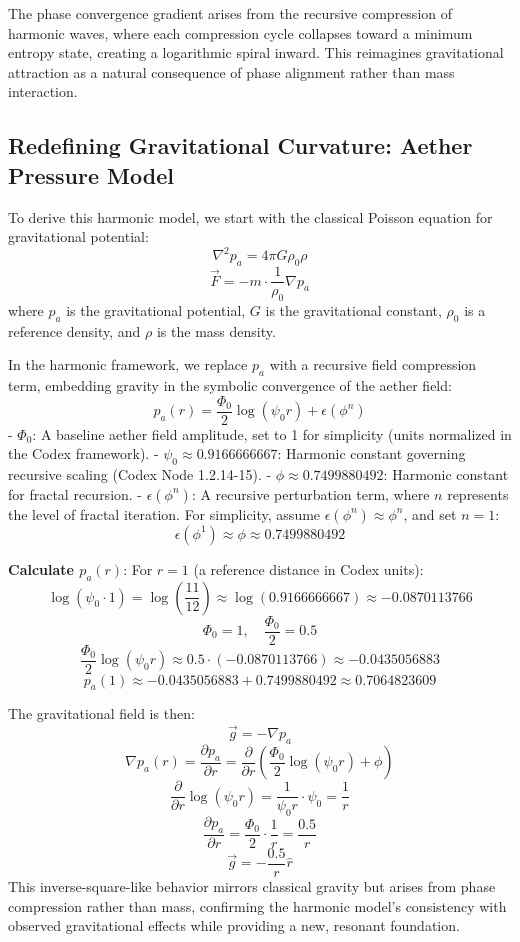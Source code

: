 The phase convergence gradient arises from the recursive compression of harmonic waves, where each compression cycle collapses toward a minimum entropy state, creating a logarithmic spiral inward. This reimagines gravitational attraction as a natural consequence of phase alignment rather than mass interaction.

\subsection{Redefining Gravitational Curvature: Aether Pressure Model}
To derive this harmonic model, we start with the classical Poisson equation for gravitational potential:
\[
\nabla^2 p_a = 4\pi G \rho_0 \rho
\]
\[
\vec{F} = -m \cdot \frac{1}{\rho_0} \nabla p_a
\]
where \( p_a \) is the gravitational potential, \( G \) is the gravitational constant, \( \rho_0 \) is a reference density, and \( \rho \) is the mass density.

In the harmonic framework, we replace \( p_a \) with a recursive field compression term, embedding gravity in the symbolic convergence of the aether field:
\[
p_a(r) = \frac{\Phi_0}{2} \log(\psi_0 r) + \epsilon(\phi^n)
\]
- \( \Phi_0 \): A baseline aether field amplitude, set to 1 for simplicity (units normalized in the Codex framework).
- \( \psi_0 \approx 0.9166666667 \): Harmonic constant governing recursive scaling (Codex Node 1.2.14-15).
- \( \phi \approx 0.7499880492 \): Harmonic constant for fractal recursion.
- \( \epsilon(\phi^n) \): A recursive perturbation term, where \( n \) represents the level of fractal iteration. For simplicity, assume \( \epsilon(\phi^n) \approx \phi^n \), and set \( n = 1 \):
\[
\epsilon(\phi^1) \approx \phi \approx 0.7499880492
\]

\textbf{Calculate \( p_a(r) \)}:
For \( r = 1 \) (a reference distance in Codex units):
\[
\log(\psi_0 \cdot 1) = \log\left(\frac{11}{12}\right) \approx \log(0.9166666667) \approx -0.0870113766
\]
\[
\Phi_0 = 1, \quad \frac{\Phi_0}{2} = 0.5
\]
\[
\frac{\Phi_0}{2} \log(\psi_0 r) \approx 0.5 \cdot (-0.0870113766) \approx -0.0435056883
\]
\[
p_a(1) \approx -0.0435056883 + 0.7499880492 \approx 0.7064823609
\]

The gravitational field is then:
\[
\vec{g} = -\nabla p_a
\]
\[
\nabla p_a(r) = \frac{\partial p_a}{\partial r} = \frac{\partial}{\partial r} \left( \frac{\Phi_0}{2} \log(\psi_0 r) + \phi \right)
\]
\[
\frac{\partial}{\partial r} \log(\psi_0 r) = \frac{1}{\psi_0 r} \cdot \psi_0 = \frac{1}{r}
\]
\[
\frac{\partial p_a}{\partial r} = \frac{\Phi_0}{2} \cdot \frac{1}{r} = \frac{0.5}{r}
\]
\[
\vec{g} = -\frac{0.5}{r} \hat{r}
\]
This inverse-square-like behavior mirrors classical gravity but arises from phase compression rather than mass, confirming the harmonic model’s consistency with observed gravitational effects while providing a new, resonant foundation.

